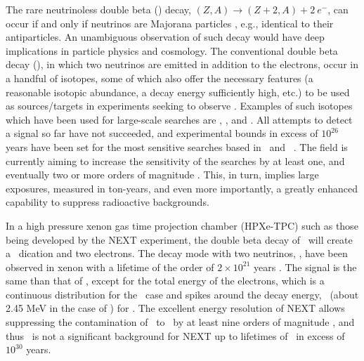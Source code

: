 \documentclass[aps,prl,reprint,longbibliography,superscriptaddress, english]{revtex4-1}
\begin{document}
The rare neutrinoless double beta  (\bbonu) decay, $(Z,A) \rightarrow (Z+2,A) + 2\ e^{-}$, can occur if and only if neutrinos are Majorana particles \cite{Majorana:1937}, e.g., identical to their antiparticles. An unambiguous observation of such decay would have deep implications in particle physics and cosmology\cite{Sakharov1967,Fukugita:1986hr, GellMann:1980vs, Yanagida:1979as, Mohapatra:1979ia}. 
The conventional double beta decay (\bbtnu), in which two neutrinos are emitted in addition to the electrons, occur in a handful of isotopes, some of which also offer the necessary features (a reasonable isotopic abundance, a decay energy sufficiently high, etc.) to be used as sources/targets in experiments seeking to observe \bbonu. Examples of such isotopes which have been used for large-scale searches are \GE, \TE, and \XE. All attempts to detect a signal so far have not succeeded, and experimental bounds in excess of $10^{26}$ years have been set for the most sensitive searches based in \XE\ and \GE\ \cite{Gando:2016ji, Agostini:2018tnm}.
The field is currently aiming to increase the sensitivity of the searches by at least one, and eventually two or more orders of magnitude \cite{Gomez-Cadenas:2019sfa}. This, in turn, implies large exposures, measured in ton-years, and even more importantly, a greatly enhanced capability to suppress radioactive backgrounds. 

In a high pressure xenon gas time projection chamber (HPXe-TPC) such as those being developed by the NEXT experiment, the double beta decay of \XE\ will create a \Bapp\ dication and two electrons.
%
The decay mode with two neutrinos, \bbtnu, have been observed in xenon with a lifetime of the order of $2 \times 10^{21}$ years \cite{Ackerman:2011gz}. The  signal is the same than that of \bbonu, except for the total energy of the electrons, which is a continuous distribution for the \bbtnu\ case and spikes around the decay energy, \Qbb\ (about 2.45 MeV in the case of \XE) for \bbonu. The excellent energy resolution of NEXT allows suppressing the contamination of \bbtnu\ to \bbonu\ by at least nine orders of magnitude \cite{rivilla_fluorescent_2020}, and thus \bbtnu\ is not a significant background for NEXT up to lifetimes of \bbonu\ in excess of $10^{30}$ years. 
\end{document}
